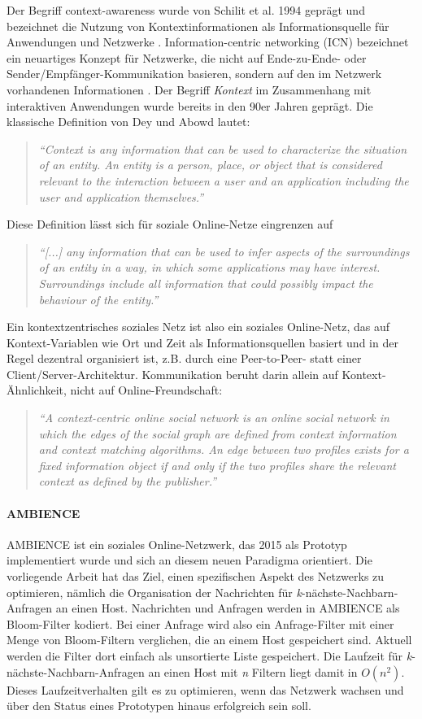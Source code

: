 Der Begriff context-awareness wurde von Schilit et al. 1994 geprägt und bezeichnet die Nutzung von Kontextinformationen als Informationsquelle für Anwendungen und Netzwerke \cite{Schilit1994}. Information-centric networking (ICN) bezeichnet ein neuartiges Konzept für Netzwerke, die nicht auf Ende-zu-Ende- oder Sender/Empfänger-Kommunikation basieren, sondern auf den im Netzwerk vorhandenen Informationen \cite{Ahlgren2012}. 
Der Begriff \textit{Kontext} im Zusammenhang mit interaktiven Anwendungen wurde bereits in den 90er Jahren geprägt. Die klassische Definition von Dey und Abowd lautet: 
\begin{quote}
\textit{"`Context is any information that can be used to characterize the situation of an entity. An entity is a person, place, or object that is considered relevant to the interaction between a user and an application including the user and application themselves."'} \cite{Dey1999} 
\end{quote}
Diese Definition lässt sich für soziale Online-Netze eingrenzen auf 
\begin{quote}
\textit{"`[...] any information that can be used to infer aspects of the surroundings of an entity in a way, in which some applications may have interest. Surroundings include all information that could possibly impact the behaviour of the entity."'} \cite{Werner2015}
\end{quote}
Ein kontextzentrisches soziales Netz ist also ein soziales Online-Netz, das auf Kontext-Variablen wie Ort und Zeit als Informationsquellen basiert und in der Regel dezentral organisiert ist, z.B. durch eine Peer-to-Peer- statt einer Client/Server-Architektur. Kommunikation beruht darin allein auf Kontext-Ähnlichkeit, nicht auf Online-Freundschaft: 
\begin{quote}
\textit{"`A context-centric online social network is an online social network in which the edges of the social graph are defined from context information and context matching algorithms. An edge between two profiles exists for a fixed information object if and only if the two profiles share the relevant context as defined by the publisher."'} \cite{Werner2015}
\end{quote}
\paragraph*{AMBIENCE}
AMBIENCE ist ein soziales Online-Netzwerk, das 2015 als Prototyp implementiert wurde und sich an diesem neuen Paradigma orientiert. Die vorliegende Arbeit hat das Ziel, einen spezifischen Aspekt des Netzwerks zu optimieren, nämlich die Organisation der Nachrichten für \textit{k}-nächste-Nachbarn-Anfragen an einen Host. Nachrichten und Anfragen werden in AMBIENCE als Bloom-Filter kodiert. Bei einer Anfrage wird also ein Anfrage-Filter mit einer Menge von Bloom-Filtern verglichen, die an einem Host gespeichert sind. Aktuell werden die Filter dort einfach als unsortierte Liste gespeichert. Die Laufzeit für \textit{k}-nächste-Nachbarn-Anfragen an einen Host mit \textit{n} Filtern liegt damit in $O(n^2)$. Dieses Laufzeitverhalten gilt es zu optimieren, wenn das Netzwerk wachsen und über den Status eines Prototypen hinaus erfolgreich sein soll. 
